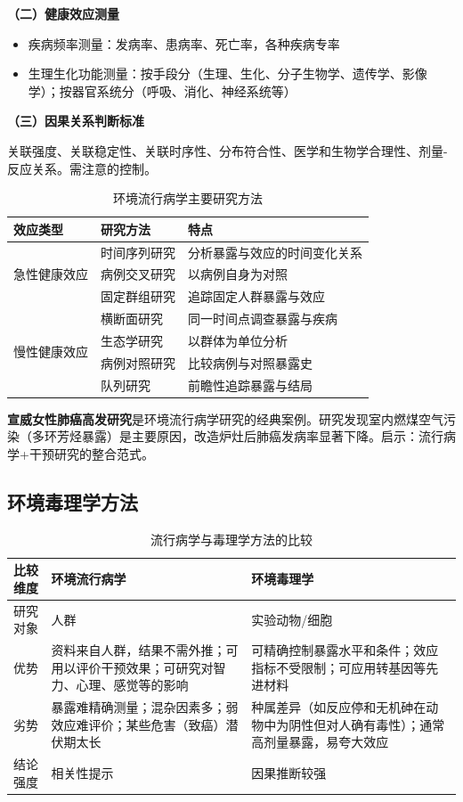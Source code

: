 \textbf{（二）健康效应测量}

\begin{itemize}[leftmargin=*]
    \item 疾病频率测量：发病率、患病率、死亡率，各种疾病专率
    \item 生理生化功能测量：按手段分（生理、生化、分子生物学、遗传学、影像学）；按器官系统分（呼吸、消化、神经系统等）
\end{itemize}

\textbf{（三）因果关系判断标准}

关联强度、关联稳定性、关联时序性、分布符合性、医学和生物学合理性、剂量-反应关系。需注意的控制。

\begin{table}[htbp]
\centering
\caption{环境流行病学主要研究方法}
\begin{tabularx}{\textwidth}{lXl}
\hline
\textbf{效应类型} & \textbf{研究方法} & \textbf{特点} \\
\hline
\multirow{3}{*}{急性健康效应} & 时间序列研究 & 分析暴露与效应的时间变化关系 \\
& 病例交叉研究 & 以病例自身为对照 \\
& 固定群组研究 & 追踪固定人群暴露与效应 \\
\hline
\multirow{4}{*}{慢性健康效应} & 横断面研究 & 同一时间点调查暴露与疾病 \\
& 生态学研究 & 以群体为单位分析 \\
& 病例对照研究 & 比较病例与对照暴露史 \\
& 队列研究 & 前瞻性追踪暴露与结局 \\
\hline
\end{tabularx}
\end{table}

\begin{tipbox}
\textbf{宣威女性肺癌高发研究}是环境流行病学研究的经典案例。研究发现室内燃煤空气污染（多环芳烃暴露）是主要原因，改造炉灶后肺癌发病率显著下降。启示：流行病学+干预研究的整合范式。
\end{tipbox}

\subsection{环境毒理学方法}

\begin{table}[htbp]
\centering
\caption{流行病学与毒理学方法的比较}
\begin{tabularx}{\textwidth}{lXX}
\hline
\textbf{比较维度} & \textbf{环境流行病学} & \textbf{环境毒理学} \\
\hline
研究对象 & 人群 & 实验动物/细胞 \\
优势 & 资料来自人群，结果不需外推；可用以评价干预效果；可研究对智力、心理、感觉等的影响 & 可精确控制暴露水平和条件；效应指标不受限制；可应用转基因等先进材料 \\
劣势 & 暴露难精确测量；混杂因素多；弱效应难评价；某些危害（致癌）潜伏期太长 & 种属差异（如反应停和无机砷在动物中为阴性但对人确有毒性）；通常高剂量暴露，易夸大效应 \\
结论强度 & 相关性提示 & 因果推断较强 \\
\hline
\end{tabularx}
\end{table}

